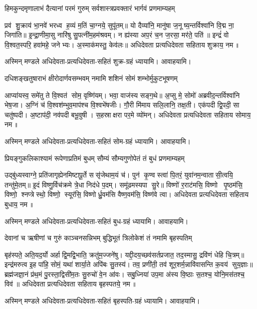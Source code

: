 \twolineshloka
{हिमकुन्दमृणालाभं दैत्यानां परमं गुरुम्}
{सर्वशास्त्रप्रवक्तारं भार्गवं प्रणमाम्यहम्}

प्रव॑ शु॒क्राय॑ भा॒नवे॑ भरध्व ह॒व्यं म॒तिं चा॒ग्नये॒ सुपू॑तम्॥ यो दैव्या॑नि॒ मानु॑षा
ज॒नूष्य॒न्तर्विश्वा॑नि वि॒द्म ना॒ जिगा॑ति॥ इ॒न्द्रा॒णीमा॒सु नारि॑षु सु॒पत्नी॑म॒हम॑श्रवम्। न
ह्य॑स्या अप॒रं च॒न ज॒रसा॒ मर॑ते॒ पति॑॥ इन्द्रं॑ वो वि॒श्वत॒स्परि॒ हवा॑महे॒ जनेभ्यः। अ॒स्माक॑मस्तु॒
केव॑लः॥  अधिदेवता प्रत्यधिदेवता सहिताय शुक्राय॒ नम॥ 

अस्मिन् मण्डले अधिदेवता-प्रत्यधिदेवता-सहितं शुक्र-ग्रहं ध्यायामि। आवाहयामि।


\twolineshloka
{दधिशङ्खतुषाराभं क्षीरोदार्णवसम्भवम्}
{नमामि शशिनं सोमं शम्भोर्मुकुटभूषणम्}

आप्या॑यस्व॒ समे॑तु ते वि॒श्वत॑ सोम॒ वृष्णि॑यम्। भवा॒ वाज॑स्य सङ्ग॒थे॥ अ॒प्सु मे॒ सोमो॑
अब्रवीद॒न्तर्विश्वा॑नि भेष॒जा। अ॒ग्निं च॑ वि॒श्वश॑म्भुव॒माप॑श्च वि॒श्वभे॑षजीः। गौ॒री मि॑माय
सलि॒लानि॒ तक्ष॒ती। एक॑पदी द्वि॒पदी॒ सा चतु॑ष्पदी। अ॒ष्टाप॑दी॒ नव॑पदी बभू॒वुषी। स॒हस्राक्षरा पर॒मे
व्यो॑मन्।  अधिदेवता प्रत्यधिदेवता सहिताय सोमाय॒ नम॥ 

अस्मिन् मण्डले अधिदेवता-प्रत्यधिदेवता-सहितं सोम-ग्रहं ध्यायामि। आवाहयामि।


\twolineshloka
{प्रियङ्गुकलिकाश्यामं रूपेणाप्रतिमं बुधम्}
{सौम्यं सौम्यगुणोपेतं तं बुधं प्रणमाम्यहम्}

उद्बु॑ध्यस्वाग्ने॒ प्रति॑जागृह्येनमिष्टापू॒र्ते ससृ॑जेथाम॒यं च॑। पुन॑ कृ॒ण्वस्त्वा॑ पि॒तरं॒
युवा॑नम॒न्वातासी॒त्वयि॒ तन्तु॑मे॒तम्॥ इ॒दं विष्णु॒र्विच॑क्रमे त्रे॒धा निद॑धे प॒दम्। समू॑ढमस्यपा
सु॒रे॥ विष्णो॑ र॒राट॑मसि॒ विष्णो पृ॒ष्ठम॑सि॒ विष्णो॒ श्नप्त्रेस्थो॒ विष्णो॒ स्यूर॑सि॒
विष्णोर्ध्रु॒वम॑सि वैष्ण॒वम॑सि॒ विष्ण॑वे त्वा।  अधिदेवता प्रत्यधिदेवता सहिताय बुधाय॒ नम॥ 

अस्मिन् मण्डले अधिदेवता-प्रत्यधिदेवता-सहितं बुध-ग्रहं ध्यायामि। आवाहयामि।


\twolineshloka
{देवानां च ऋषीणां च गुरुं काञ्चनसन्निभम्}
{बुद्धिभूतं त्रिलोकेशं तं नमामि बृहस्पतिम्}

बृह॑स्पते॒ अति॒यद॒र्यो अर्हाद्वि॒मद्वि॒भाति॒ क्रतु॑म॒ज्जने॑षु। यद्दी॒दय॒च्छव॑सर्त\-प्रजात॒
तद॒स्मासु॒ द्रवि॑णं धेहि चि॒त्रम्॥ इन्द्र॑मरुत्व इ॒ह पा॑हि॒ सोमं॒ यथा॑ शार्या॒ते अपि॑बः सु॒तस्य॑।
तव॒ प्रणी॑ती॒ तव॑ शूर॒शर्म॒न्नावि॑वासन्ति क॒वय॑ सुय॒ज्ञाः॥ ब्रह्म॑जज्ञा॒नं प्र॑थ॒मं
पु॒रस्ता॒द्विसी॑म॒तः सु॒रुचो॑ वे॒न आ॑वः। सबु॒ध्निया॑ उप॒मा अ॑स्य वि॒ष्ठाः स॒तश्च॒ योनि॒मस॑तश्च॒
विव॑॥ अधिदेवता प्रत्यधिदेवता सहिताय बृहस्पतये॒ नम॥ 

अस्मिन् मण्डले अधिदेवता-प्रत्यधिदेवता-सहितं बृहस्पति-ग्रहं ध्यायामि। आवाहयामि।

